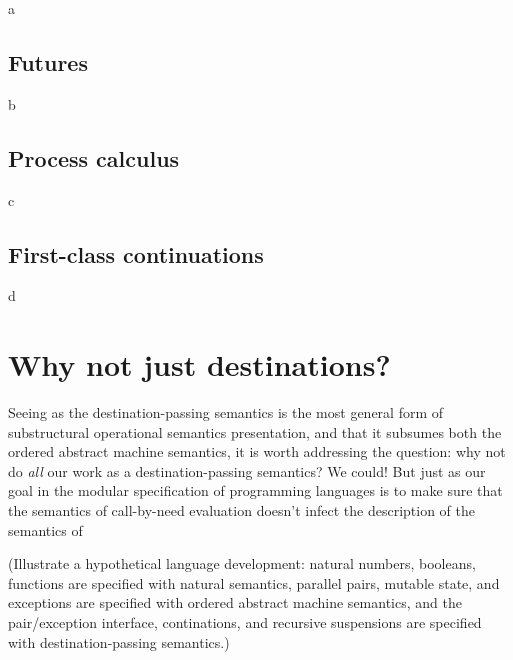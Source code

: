 a

\subsection{Futures}

b

\subsection{Process calculus}

c

\subsection{First-class continuations}

d

\section{Why not just destinations?}

Seeing as the destination-passing semantics is the most general form
of substructural operational semantics presentation, and that it
subsumes both the ordered abstract machine semantics, it is worth
addressing the question: why not do {\it all} our work as a
destination-passing semantics? We could! But just as our goal in the
modular specification of programming languages is to make sure that
the semantics of call-by-need evaluation doesn't infect the
description of the semantics of

(Illustrate a hypothetical language development: natural numbers,
booleans, functions are specified with natural semantics, parallel
pairs, mutable state, and exceptions are specified with ordered
abstract machine semantics, and the pair/exception interface,
continations, and recursive suspensions are specified with
destination-passing semantics.)

